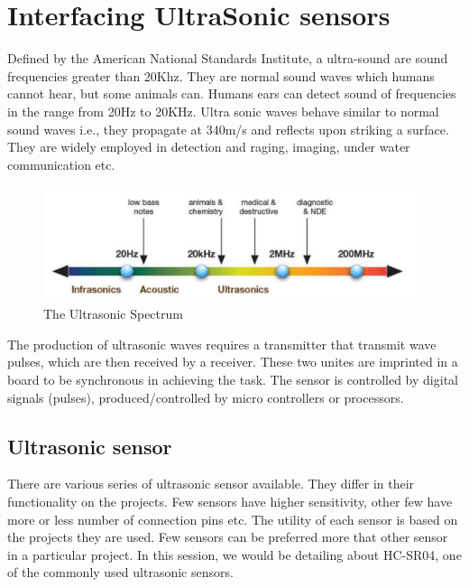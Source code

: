 \chapter{Interfacing UltraSonic sensors}
\label{ch:ultrasonic}

\par Defined by the American National Standards Institute, a ultra-sound are sound frequencies greater than 20Khz. They are normal sound waves which humans cannot hear, but some animals can. Humans ears can detect sound of frequencies in the range from 20Hz to 20KHz. Ultra sonic waves behave similar to normal sound waves i.e., they propagate at 340m/s and reflects upon striking a surface. They are widely employed in detection and raging, imaging, under water communication etc.

\begin{figure}
	\centering
	\includegraphics[width=4.3in]{Images/Ultrasonic/spectrum.png}
	\caption{The Ultrasonic Spectrum}
\end{figure}

 The production of ultrasonic waves requires a transmitter that transmit wave pulses, which are then received by a receiver. These two unites are imprinted in a board to be synchronous in achieving the task. The sensor is controlled by digital signals (pulses), produced/controlled by micro controllers or processors. 

\section{Ultrasonic sensor}
\par There are various series of ultrasonic sensor available. They differ in their functionality on the projects. Few sensors have higher sensitivity, other few have more or less number of connection pins etc. The utility of each sensor is based on the projects they are used. Few sensors can be preferred more that other sensor in a particular project. In this session, we would be detailing about HC-SR04, one of the commonly used ultrasonic sensors.

